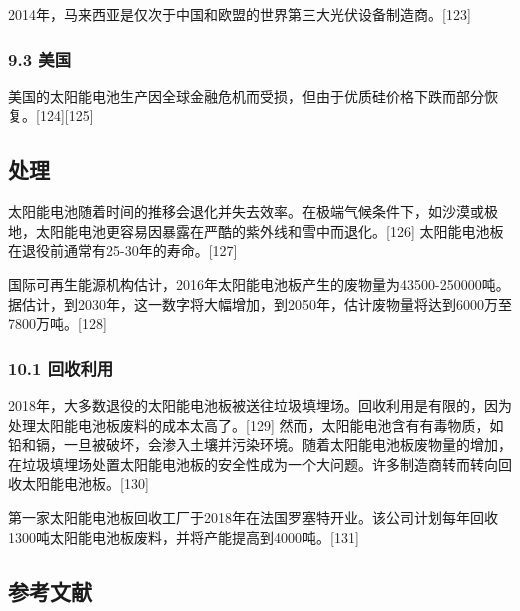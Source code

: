 2014年，马来西亚是仅次于中国和欧盟的世界第三大光伏设备制造商。[123]

\subsubsection{9.3 美国}

美国的太阳能电池生产因全球金融危机而受损，但由于优质硅价格下跌而部分恢复。[124][125]

\subsection{处理}

太阳能电池随着时间的推移会退化并失去效率。在极端气候条件下，如沙漠或极地，太阳能电池更容易因暴露在严酷的紫外线和雪中而退化。[126] 太阳能电池板在退役前通常有25-30年的寿命。[127]

国际可再生能源机构估计，2016年太阳能电池板产生的废物量为43500-250000吨。据估计，到2030年，这一数字将大幅增加，到2050年，估计废物量将达到6000万至7800万吨。[128]

\subsubsection{10.1 回收利用}

2018年，大多数退役的太阳能电池板被送往垃圾填埋场。回收利用是有限的，因为处理太阳能电池板废料的成本太高了。[129] 然而，太阳能电池含有有毒物质，如铅和镉，一旦被破坏，会渗入土壤并污染环境。随着太阳能电池板废物量的增加，在垃圾填埋场处置太阳能电池板的安全性成为一个大问题。许多制造商转而转向回收太阳能电池板。[130]

第一家太阳能电池板回收工厂于2018年在法国罗塞特开业。该公司计划每年回收1300吨太阳能电池板废料，并将产能提高到4000吨。[131]

\subsection{参考文献}

